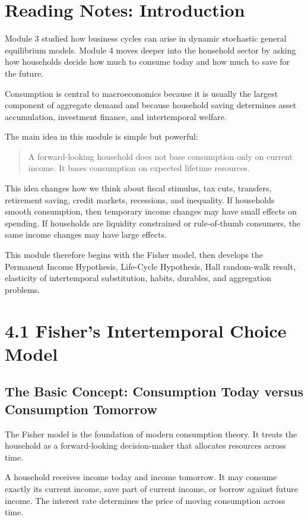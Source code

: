 \documentclass[12pt,a4paper]{article}
\begin{document}
\section*{Reading Notes: Introduction}
Module 3 studied how business cycles can arise in dynamic stochastic general equilibrium models. Module 4 moves deeper into the household sector by asking how households decide how much to consume today and how much to save for the future.

Consumption is central to macroeconomics because it is usually the largest component of aggregate demand and because household saving determines asset accumulation, investment finance, and intertemporal welfare.

The main idea in this module is simple but powerful:
\begin{quote}
A forward-looking household does not base consumption only on current income. It bases consumption on expected lifetime resources.
\end{quote}

This idea changes how we think about fiscal stimulus, tax cuts, transfers, retirement saving, credit markets, recessions, and inequality. If households smooth consumption, then temporary income changes may have small effects on spending. If households are liquidity constrained or rule-of-thumb consumers, the same income changes may have large effects.

This module therefore begins with the Fisher model, then develops the Permanent Income Hypothesis, Life-Cycle Hypothesis, Hall random-walk result, elasticity of intertemporal substitution, habits, durables, and aggregation problems.

\section*{4.1 Fisher's Intertemporal Choice Model}
\subsection*{The Basic Concept: Consumption Today versus Consumption Tomorrow}
The Fisher model is the foundation of modern consumption theory. It treats the household as a forward-looking decision-maker that allocates resources across time.

A household receives income today and income tomorrow. It may consume exactly its current income, save part of current income, or borrow against future income. The interest rate determines the price of moving consumption across time.
\end{document}
